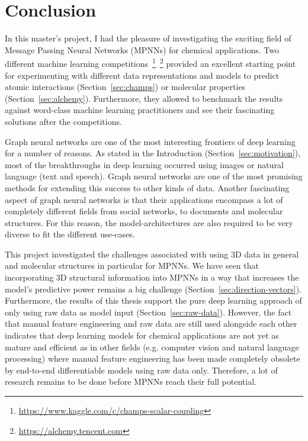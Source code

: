 \chapter{Conclusion}
\label{chapter:Conclusion}

In this master's project, I had the pleasure of investigating the exciting field of Message Passing Neural Networks (MPNNs) for chemical applications. Two different machine learning competitions~\footnote{\url{https://www.kaggle.com/c/champs-scalar-coupling}}~\footnote{\url{https://alchemy.tencent.com}} provided an excellent starting point for experimenting with different data representations and models to predict atomic interactions (Section~\ref{sec:champs}) or molecular properties (Section~\ref{sec:alchemy}). Furthermore, they allowed to benchmark the results against word-class machine learning practitioners and see their fascinating solutions after the competitions.

Graph neural networks are one of the most interesting frontiers of deep learning for a number of reasons. As stated in the Introduction (Section~\ref{sec:motivation}), most of the breakthroughs in deep learning occurred using images or natural language (text and speech). Graph neural networks are one of the most promising methods for extending this success to other kinds of data. Another fascinating aspect of graph neural networks is that their applications encompass a lot of completely different fields from social networks, to documents and molecular structures. For this reason, the model-architectures are also required to be very diverse to fit the different use-cases.

This project investigated the challenges associated with using 3D data in general and molecular structures in particular for MPNNs. We have seen that incorporating 3D structural information into MPNNs in a way that increases the model's predictive power remains a big challenge (Section~\ref{sec:direction-vectors}). Furthermore, the results of this thesis support the pure deep learning approach of only using raw data as model input (Section~\ref{sec:raw-data}). However, the fact that manual feature engineering and raw data are still used alongside each other indicates that deep learning models for chemical applications are not yet as mature and efficient as in other fields (e.g. computer vision and natural language processing) where manual feature engineering has been made completely obsolete by end-to-end differentiable models using raw data only. Therefore, a lot of research remains to be done before MPNNs reach their full potential.

